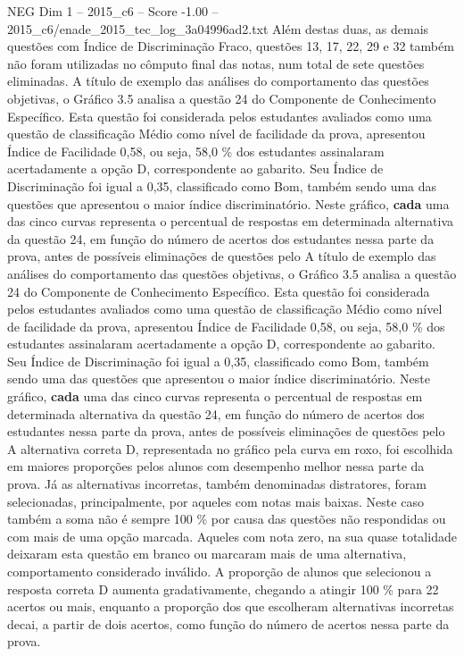 \begin{textsample}{NEG Dim 1 – 2015\_c6 – Score -1.00 – 2015\_c6/enade\_2015\_tec\_log\_3a04996ad2.txt}
Além destas duas, as demais questões com Índice de Discriminação Fraco, questões 13, 17, 22, 29 e 32 também não foram utilizadas no cômputo final das notas, num total de sete questões eliminadas.
A título de exemplo das análises do comportamento das questões objetivas, o Gráfico 3.5 analisa a questão 24 do Componente de Conhecimento Específico.
Esta questão foi considerada pelos estudantes avaliados como uma questão de classificação Médio como nível de facilidade da prova, apresentou Índice de Facilidade 0,58, ou seja, 58,0 \% dos estudantes assinalaram acertadamente a opção D, correspondente ao gabarito.
Seu Índice de Discriminação foi igual a 0,35, classificado como Bom, também sendo uma das questões que apresentou o maior índice discriminatório.
Neste gráfico, \textbf{cada} uma das cinco curvas representa o percentual de respostas em determinada alternativa da questão 24, em função do número de acertos dos estudantes nessa parte da prova, antes de possíveis eliminações de questões pelo A título de exemplo das análises do comportamento das questões objetivas, o Gráfico 3.5 analisa a questão 24 do Componente de Conhecimento Específico.
Esta questão foi considerada pelos estudantes avaliados como uma questão de classificação Médio como nível de facilidade da prova, apresentou Índice de Facilidade 0,58, ou seja, 58,0 \% dos estudantes assinalaram acertadamente a opção D, correspondente ao gabarito.
Seu Índice de Discriminação foi igual a 0,35, classificado como Bom, também sendo uma das questões que apresentou o maior índice discriminatório.
Neste gráfico, \textbf{cada} uma das cinco curvas representa o percentual de respostas em determinada alternativa da questão 24, em função do número de acertos dos estudantes nessa parte da prova, antes de possíveis eliminações de questões pelo A alternativa correta D, representada no gráfico pela curva em roxo, foi escolhida em maiores proporções pelos alunos com desempenho melhor nessa parte da prova.
Já as alternativas incorretas, também denominadas distratores, foram selecionadas, principalmente, por aqueles com notas mais baixas.
Neste caso também a soma não é sempre 100 \% por causa das questões não respondidas ou com mais de uma opção marcada.
Aqueles com nota zero, na sua quase totalidade deixaram esta questão em branco ou marcaram mais de uma alternativa, comportamento considerado inválido.
A proporção de alunos que selecionou a resposta correta D aumenta gradativamente, chegando a atingir 100 \% para 22 acertos ou mais, enquanto a proporção dos que escolheram alternativas incorretas decai, a partir de dois acertos, como função do número de acertos nessa parte da prova.

\end{textsample}
